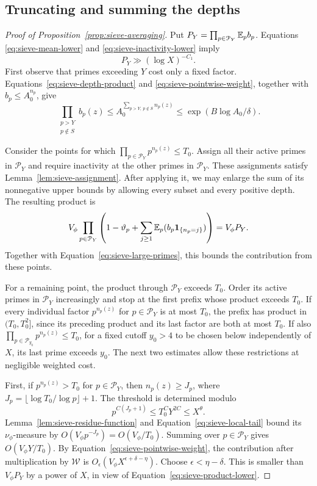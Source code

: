 \subsection{Truncating and summing the depths}

\begin{proof}[Proof of Proposition~\ref{prop:sieve-averaging}]
Put
$P_Y=\prod_{p\in\mathcal P_Y}\mathbb E_p b_p$.  Equations
\eqref{eq:sieve-mean-lower} and
\eqref{eq:sieve-inactivity-lower} imply
\begin{equation}\label{eq:sieve-product-lower}
 P_Y\gg(\log X)^{-C_1}.
\end{equation}
First observe that primes exceeding $Y$ cost only a fixed factor.
Equations~\eqref{eq:sieve-depth-product} and
\eqref{eq:sieve-pointwise-weight}, together with $b_p\le A_0^{n_p}$, give
\begin{equation}\label{eq:sieve-large-primes}
 \prod_{\substack{p>Y\\p\notin S}}b_p(z)
 \le A_0^{\sum_{p>Y,\ p\notin S}n_p(z)}
 \le \exp(B\log A_0/\delta).
\end{equation}

Consider the points for which
$\prod_{p\in\mathcal P_Y}p^{n_p(z)}\le T_0$.
Assign all their active primes in $\mathcal P_Y$ and require inactivity
at the other primes in $\mathcal P_Y$.  These assignments satisfy
Lemma~\ref{lem:sieve-assignment}.  After applying it, we may enlarge the
sum of its nonnegative upper bounds by allowing every subset and every
positive depth.  The resulting product is
\[
 V_\phi\prod_{p\in\mathcal P_Y}
   \left(1-\vartheta_p+
       \sum_{j\ge1}\mathbb E_p(b_p\mathbf 1_{\{n_p=j\}})\right)
   =V_\phi P_Y.
\]
Together with Equation~\eqref{eq:sieve-large-primes}, this bounds the
contribution from these points.

For a remaining point, the product through $\mathcal P_Y$ exceeds $T_0$.
Order its active primes in $\mathcal P_Y$ increasingly and stop at the
first prefix whose product exceeds $T_0$.  If every individual factor
$p^{n_p(z)}$ for $p\in\mathcal P_Y$ is at most $T_0$, the prefix has product in
$(T_0,T_0^2]$, since its preceding product and its last factor are both
at most $T_0$.  If also
$\prod_{p\in\mathcal P_{y_0}}p^{n_p(z)}\le T_0$, for a fixed cutoff
$y_0>4$ to be chosen below independently of $X$, its last prime exceeds
$y_0$.  The next two estimates allow these restrictions at negligible
weighted cost.

First, if $p^{n_p(z)}>T_0$ for $p\in\mathcal P_Y$, then
$n_p(z)\ge J_p$, where
$J_p=\lfloor\log T_0/\log p\rfloor+1$.  The threshold is determined modulo
\[
 p^{C(J_p+1)}\le T_0^C Y^{2C}\le X^\theta.
\]
Lemma~\ref{lem:sieve-residue-function} and
Equation~\eqref{eq:sieve-local-tail} bound its $\nu_\phi$-measure by
$O(V_\phi p^{-J_p})=O(V_\phi/T_0)$.  Summing over $p\in\mathcal P_Y$
gives $O(V_\phi Y/T_0)$.  By Equation~\eqref{eq:sieve-pointwise-weight},
the contribution after multiplication by $\mathcal W$ is
$O_\epsilon(V_\phi X^{\epsilon+\delta-\eta})$.
Choose $\epsilon<\eta-\delta$.  This is smaller than $V_\phi P_Y$ by a
power of $X$, in view of Equation~\eqref{eq:sieve-product-lower}.


\end{proof}
